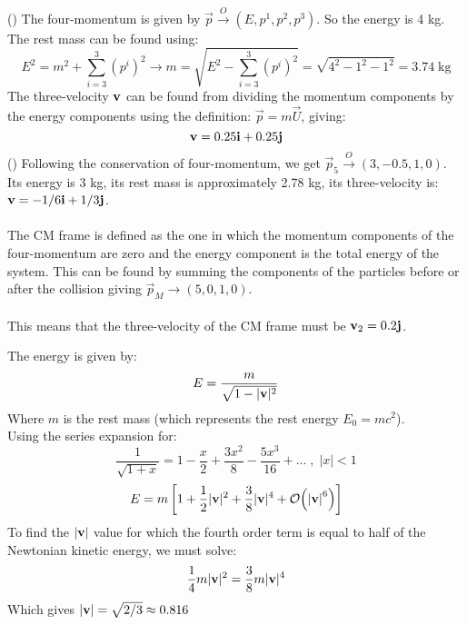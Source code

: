 \documentclass{report}
\theoremstyle{definition}
\newcounter{subpart1}[chapter1]
\begin{document}
\begin{chapter2}\label{prob: 22}
	()
	The four-momentum is given by $\vec p \stackrel{O} \longrightarrow (E, p^1, p^2, p^3)$. So the energy is 4 kg. \\
	The rest mass can be found using:
	\begin{equation}
		E^2 = m^2 + \sum^3_{i=3} (p^i)^2 \longrightarrow m = \sqrt{E^2 - \sum^3_{i=3}(p^i)^2} = \sqrt{4^2 - 1^2 - 1^2} = 3.74 \;\mathrm{kg} 
	\end{equation}
	The three-velocity $\bf v$ can be found from dividing the momentum components by the energy components using the definition: $\vec p = m\vec U$, giving:
	\begin{equation}
		{\bf v} = 0.25{\bf i} + 0.25{\bf j}
	\end{equation}
	()
	Following the conservation of four-momentum, we get $\vec p_5 \stackrel{O}\rightarrow (3, -0.5, 1, 0)$. Its energy is 3 kg, its rest mass is approximately 2.78 kg, its three-velocity is: ${\bf v} = -1/6{\bf i} + 1/3{\bf j}$.\\\\
	The CM frame is defined as the one in which the momentum components of the four-momentum are zero and the energy component is the total energy of the system. This can be found by summing the components of the particles before or after the collision giving $\vec p_M \rightarrow (5, 0, 1, 0)$.\\\\
	This means that the three-velocity of the CM frame must be ${\bf v}_2 = 0.2{\bf j}$.
\end{chapter2}

\begin{chapter2}\label{prob: 23}
	The energy is given by:
	\begin{equation}
		E = \frac{m}{\sqrt{1-|{\bf v}|^2}}
	\end{equation}
	Where $m$ is the rest mass (which represents the rest energy $E_0 = mc^2$). \\
	Using the series expansion for: $$\frac{1}{\sqrt{1 + x}} = 1-\frac{x}{2} + \frac{3x^2}{8} - \frac{5x^3}{16} + ... \;,\; |x| < 1 $$
	\begin{equation}
		E = m\left[1 + \frac{1}{2}|{\bf v}|^2 + \frac{3}{8}|{\bf v}|^4 + \order{\abs{\bf v}^6} \right]
	\end{equation}
	To find the $|\bf v|$ value for which the fourth order term is equal to half of the Newtonian kinetic energy, we must solve:
	\begin{equation}
		\frac{1}{4}m|{\bf v}|^2 = \frac{3}{8}m|{\bf v}|^4
	\end{equation}
	Which gives $|{\bf v}| = \sqrt{2/3} \approx 0.816$
\end{chapter2}
\end{document}
